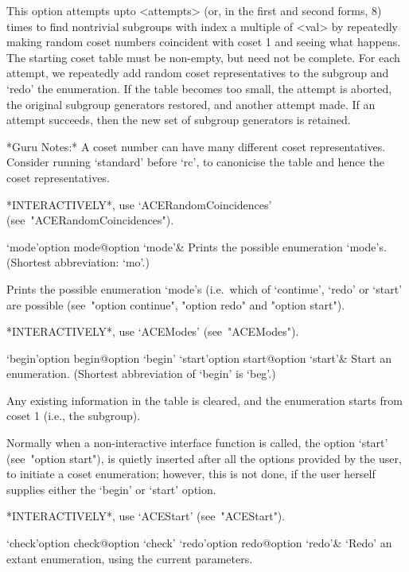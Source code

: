 This option attempts upto <attempts> (or,  in  the  first  and  second
forms, 8) times to find nontrivial subgroups with index a multiple  of
<val> by repeatedly making random coset numbers coincident with  coset
1 and seeing what happens. The starting coset table must be non-empty,
but need not be complete. For each attempt, we repeatedly  add  random
coset representatives to the subgroup and `redo' the  enumeration.  If
the table becomes too small, the  attempt  is  aborted,  the  original
subgroup generators restored, and another attempt made. If an  attempt
succeeds, then the new set of subgroup generators is retained.

*Guru Notes:*
A coset number can have many different coset representatives. Consider
running `standard' before `rc', to canonicise the table and hence  the
coset representatives.

*INTERACTIVELY*,              use              `ACERandomCoincidences'
(see~"ACERandomCoincidences").

\enditems


\beginitems

\>`mode'{option mode}@{option `mode'}&
Prints the possible enumeration `mode's.
(Shortest abbreviation: `mo'.)

Prints the possible enumeration  `mode's  (i.e.~which  of  `continue',
`redo' or `start' are possible (see~"option continue",  "option  redo"
and "option start").

*INTERACTIVELY*, use `ACEModes' (see~"ACEModes").

\>`begin'{option begin}@{option `begin'}
\>`start'{option start}@{option `start'}&
Start an enumeration. (Shortest abbreviation of `begin' is `beg'.)

Any existing information in the table is cleared, and the  enumeration
starts from coset 1 (i.e., the subgroup).

Normally when a non-interactive {\ACE} interface function  is  called,
the option `start' (see~"option start"), is quietly inserted after all
the options provided by the user, to  initiate  a  coset  enumeration;
however, this is not done, if the user  herself  supplies  either  the
`begin' or `start' option.

*INTERACTIVELY*, use `ACEStart' (see~"ACEStart").

\>`check'{option check}@{option `check'}
\>`redo'{option redo}@{option `redo'}&
`Redo' an extant enumeration, using the current parameters.

